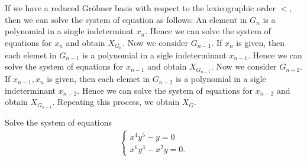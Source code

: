 If we have 
a reduced Gr\"obner basis with respect to
the lexicographic order $<$,
then we can solve the system of equation as follows:
An element in $G_n$ is a polynomial in a single indeterminat $x_n$.
Hence we can solve the system of equations for $x_{n}$
and obtain $X_{G_n}$.
Now we consider $G_{n-1}$.
If $x_n$ is given,
then each elemet in $G_{n-1}$ is
a polynomial in a sigle indeterminant $x_{n-1}$.
Hence we can solve the system of equations  for $x_{n-1}$
and obtain $X_{G_{n-1}}$.
Now we consider $G_{n-2}$.
If $x_{n-1},x_{n}$ is given,
then each elemet in $G_{n-2}$ is
a polynomial in a sigle indeterminant $x_{n-2}$.
Hence we can solve the system of equations  for $x_{n-2}$
and obtain $X_{G_{n-1}}$.
Repeating this process,
we obtain $X_G$.



\begin{quiz}
  Solve the system of equations
  \begin{align*}
    \begin{cases}
      x^4y^5-y=0\\
      x^6y^3-x^2y=0.
    \end{cases}
  \end{align*}
\end{quiz}
